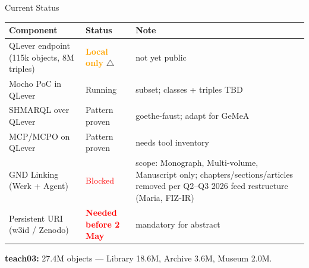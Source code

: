 \documentclass[xcolor,aspectratio=169,compress]{beamer}
\newcommand{\cmark}{\textcolor{green!60!black}{\ding{51}}}
\begin{document}
\begin{frame}{Current Status}
  \small
  \begin{tabular}{ll>{\raggedright\arraybackslash}p{5.2cm}}
    \toprule
    Component & Status & Note \\
    \midrule
    QLever endpoint (115k objects, 8M triples)
      & \textcolor{orange}{\textbf{Local only}} $\triangle$
      & not yet public \\
    Mocho PoC in QLever
      & \textcolor{green!60!black}{Running} \cmark
      & subset; classes + triples TBD \\
    SHMARQL over QLever
      & \textcolor{green!60!black}{Pattern proven} \cmark
      & goethe-faust; adapt for GeMeA \\
    MCP/MCPO on QLever
      & \textcolor{green!60!black}{Pattern proven} \cmark
      & needs tool inventory \\
    GND Linking (Werk + Agent)
      & \textcolor{red}{Blocked}
      & scope: Monograph, Multi-volume, Manuscript only;
        \footnotesize chapters/sections/articles removed per Q2--Q3 2026
        feed restructure (Maria, FIZ-IR) \\
    Persistent URI (w3id / Zenodo)
      & \textcolor{red}{\textbf{Needed before 2 May}}
      & mandatory for abstract \\
    \bottomrule
  \end{tabular}
  \smallskip

  \par\footnotesize\textbf{teach03:} 27.4M objects ---
  Library 18.6M, Archive 3.6M, Museum 2.0M.
\end{frame}
\end{document}
